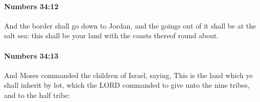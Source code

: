 		\paragraph{Numbers 34:12} %
			\label{NUMBERS-34-12}

			And the border shall go down to Jordan, and the goings out of it shall be at the salt sea: this shall be your land with the coasts thereof round about.


		\paragraph{Numbers 34:13} %
			\label{NUMBERS-34-13}

			And Moses commanded the children of Israel, saying, This is the land which ye shall inherit by lot, which the LORD commanded to give unto the nine tribes, and to the half tribe:


